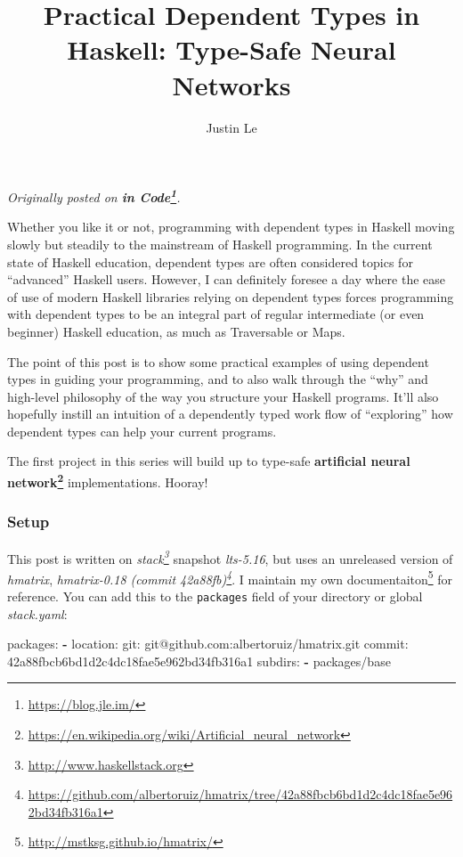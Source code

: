 \documentclass[]{article}
\title{Practical Dependent Types in Haskell: Type-Safe Neural Networks}
\author{Justin Le}
\newenvironment{Shaded}{}{}
\newcommand{\KeywordTok}[1]{\textcolor[rgb]{0.00,0.44,0.13}{\textbf{{#1}}}}
\newcommand{\FunctionTok}[1]{\textcolor[rgb]{0.02,0.16,0.49}{{#1}}}
\newcommand{\NormalTok}[1]{{#1}}
\renewcommand{\href}[2]{#2\footnote{\url{#1}}}
\begin{document}
\maketitle

\emph{Originally posted on \textbf{\href{https://blog.jle.im/}{in
Code}}.}

Whether you like it or not, programming with dependent types in Haskell
moving slowly but steadily to the mainstream of Haskell programming. In
the current state of Haskell education, dependent types are often
considered topics for ``advanced'' Haskell users. However, I can
definitely foresee a day where the ease of use of modern Haskell
libraries relying on dependent types forces programming with dependent
types to be an integral part of regular intermediate (or even beginner)
Haskell education, as much as Traversable or Maps.

The point of this post is to show some practical examples of using
dependent types in guiding your programming, and to also walk through
the ``why'' and high-level philosophy of the way you structure your
Haskell programs. It'll also hopefully instill an intuition of a
dependently typed work flow of ``exploring'' how dependent types can
help your current programs.

The first project in this series will build up to type-safe
\textbf{\href{https://en.wikipedia.org/wiki/Artificial_neural_network}{artificial
neural network}} implementations. Hooray!

\subsubsection{Setup}\label{setup}

This post is written on \emph{\href{http://www.haskellstack.org}{stack}}
snapshot \emph{lts-5.16}, but uses an unreleased version of
\emph{hmatrix},
\emph{\href{https://github.com/albertoruiz/hmatrix/tree/42a88fbcb6bd1d2c4dc18fae5e962bd34fb316a1}{hmatrix-0.18
(commit 42a88fb)}}. I \href{http://mstksg.github.io/hmatrix/}{maintain
my own documentaiton} for reference. You can add this to the
\texttt{packages} field of your directory or global \emph{stack.yaml}:

\begin{Shaded}
\begin{Highlighting}[]
\FunctionTok{packages:}
\KeywordTok{-} \FunctionTok{location:}
    \FunctionTok{git:} \NormalTok{git@github.com:albertoruiz/hmatrix.git}
    \FunctionTok{commit:} \NormalTok{42a88fbcb6bd1d2c4dc18fae5e962bd34fb316a1}
  \FunctionTok{subdirs:}
    \KeywordTok{-} \NormalTok{packages/base}
\end{Highlighting}
\end{Shaded}
\end{document}
